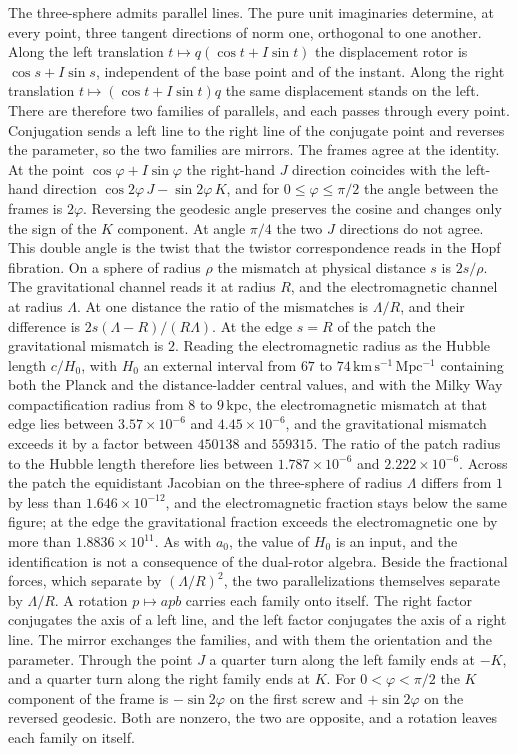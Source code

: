 \documentclass[a4paper]{article}
\begin{document}
The three-sphere admits parallel lines. The pure unit imaginaries determine, at every point, three tangent directions of norm one, orthogonal to one another. Along the left translation \(t\mapsto q(\cos t+I\sin t)\) the displacement rotor is \(\cos s+I\sin s\), independent of the base point and of the instant. Along the right translation \(t\mapsto(\cos t+I\sin t)q\) the same displacement stands on the left. There are therefore two families of parallels, and each passes through every point. Conjugation sends a left line to the right line of the conjugate point and reverses the parameter, so the two families are mirrors. The frames agree at the identity. At the point \(\cos\varphi+I\sin\varphi\) the right-hand \(J\) direction coincides with the left-hand direction \(\cos 2\varphi\, J-\sin 2\varphi\, K\), and for \(0\le\varphi\le\pi/2\) the angle between the frames is \(2\varphi\). Reversing the geodesic angle preserves the cosine and changes only the sign of the \(K\) component. At angle \(\pi/4\) the two \(J\) directions do not agree. This double angle is the twist that the twistor correspondence reads in the Hopf fibration. On a sphere of radius \(\rho\) the mismatch at physical distance \(s\) is \(2s/\rho\). The gravitational channel reads it at radius \(R\), and the electromagnetic channel at radius \(\Lambda\). At one distance the ratio of the mismatches is \(\Lambda/R\), and their difference is \(2s(\Lambda-R)/(R\Lambda)\). At the edge \(s=R\) of the patch the gravitational mismatch is \(2\). Reading the electromagnetic radius as the Hubble length \(c/H_0\), with \(H_0\) an external interval from \(67\) to \(74\,\mathrm{km\,s^{-1}\,Mpc^{-1}}\) containing both the Planck and the distance-ladder central values, and with the Milky Way compactification radius from \(8\) to \(9\,\mathrm{kpc}\), the electromagnetic mismatch at that edge lies between \(3.57\times 10^{-6}\) and \(4.45\times 10^{-6}\), and the gravitational mismatch exceeds it by a factor between \(450138\) and \(559315\). The ratio of the patch radius to the Hubble length therefore lies between \(1.787\times 10^{-6}\) and \(2.222\times 10^{-6}\). Across the patch the equidistant Jacobian on the three-sphere of radius \(\Lambda\) differs from \(1\) by less than \(1.646\times 10^{-12}\), and the electromagnetic fraction stays below the same figure; at the edge the gravitational fraction exceeds the electromagnetic one by more than \(1.8836\times 10^{11}\). As with \(a_0\), the value of \(H_0\) is an input, and the identification is not a consequence of the dual-rotor algebra. Beside the fractional forces, which separate by \((\Lambda/R)^2\), the two parallelizations themselves separate by \(\Lambda/R\). A rotation \(p\mapsto apb\) carries each family onto itself. The right factor conjugates the axis of a left line, and the left factor conjugates the axis of a right line. The mirror exchanges the families, and with them the orientation and the parameter. Through the point \(J\) a quarter turn along the left family ends at \(-K\), and a quarter turn along the right family ends at \(K\). For \(0<\varphi<\pi/2\) the \(K\) component of the frame is \(-\sin 2\varphi\) on the first screw and \(+\sin 2\varphi\) on the reversed geodesic. Both are nonzero, the two are opposite, and a rotation leaves each family on itself. 
\end{document}
